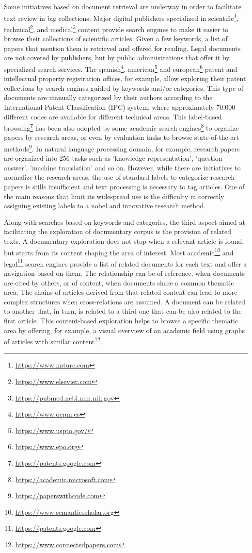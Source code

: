 Some initiatives based on document retrieval are underway in order to facilitate text review in big collections. Major digital publishers specialized in scientific\footnote{\url{https://www.nature.com}}, technical\footnote{\url{https://www.elsevier.com}}, and medical\footnote{\url{https://pubmed.ncbi.nlm.nih.gov}} content provide search engines to make it easier to browse their collections of scientific articles. Given a few keywords, a list of papers that mention them is retrieved and offered for reading. Legal documents are not covered by publishers, but by public administrations that offer it by specialized search services. The spanish\footnote{\url{https://www.oepm.es}}, american\footnote{\url{https://www.uspto.gov/}} and european\footnote{\url{https://www.epo.org}} patent and intellectual property registration offices, for example, allow exploring their patent collections by search engines guided by keywords and/or categories. This type of documents are manually categorized by their authors according to the International Patent Classification (IPC) system, where approximately 70,000 different codes are available for different technical areas. This label-based browsing\footnote{\url{https://patents.google.com}} has been also adopted by some academic search engines\footnote{\url{https://academic.microsoft.com}} to organize papers by research areas, or even by evaluation tasks to browse state-of-the-art methods\footnote{\url{https://paperswithcode.com}}. In natural language processing domain, for example, research papers are organized into 256 tasks such as 'knowledge representation', 'question-answer', 'machine translation' and so on. However, while there are initiatives to normalize the research areas, the use of standard labels to categorize research papers is stills insufficient and text processing is necessary to tag articles. One of the main reasons that limit its widespread use is the difficulty in correctly assigning existing labels to a nobel and innovative research method.

Along with searches based on keywords and categories, the third aspect aimed at facilitating the exploration of documentary corpus is the provision of related texts. A documentary exploration does not stop when a relevant article is found, but starts from its content shaping the area of interest. Most academic\footnote{\url{https://www.semanticscholar.org}} and legal\footnote{\url{https://patents.google.com}} search engines provide a list of related documents for each text and offer a navigation based on them. The relationship can be of reference, when documents are cited by others, or of content, when documents share a common thematic area. The chains of articles derived from that related content can lead to more complex structures when cross-relations are assumed. A document can be related to another that, in turn, is related to a third one that can be also related to the first article. This content-based exploration helps to browse a specific thematic area by offering, for example, a visual overview of an academic field using graphs of articles with similar content\footnote{\url{https://www.connectedpapers.com}}.


